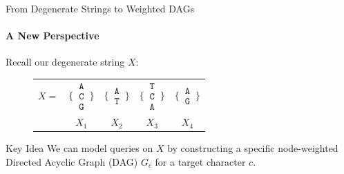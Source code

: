 \begin{frame}{From Degenerate Strings to Weighted DAGs}
    \framesubtitle{A New Perspective}

    Recall our degenerate string $X$:
    \begin{figure}[h!]
        \centering
        \begin{tabular}{c@{\hskip 0.5em}c@{\hskip 0.5em}c@{\hskip 0.5em}c@{\hskip 0.5em}c}
            $X = $                                                                           & $\Bigg\{\,\begin{matrix}\texttt{A}\\\texttt{C}\\\texttt{G}\end{matrix}\,\Bigg\}$ &
            $\Bigg\{\,\begin{matrix}\texttt{A}\\\texttt{T}\end{matrix}\,\Bigg\}$             &
            $\Bigg\{\,\begin{matrix}\texttt{T}\\\texttt{C}\\\texttt{A}\end{matrix}\,\Bigg\}$ &
            $\Bigg\{\,\begin{matrix}\texttt{A}\\\texttt{G}\end{matrix}\,\Bigg\}$                                                                                                                        \\
                                                                                             & $X_1$                                                                            & $X_2$ & $X_3$ & $X_4$
        \end{tabular}
    \end{figure}

    \begin{block}{Key Idea}
        We can model queries on $X$ by constructing a specific node-weighted Directed Acyclic Graph (DAG) $G_c$ for a target character $c$.
    \end{block}


\end{frame}

